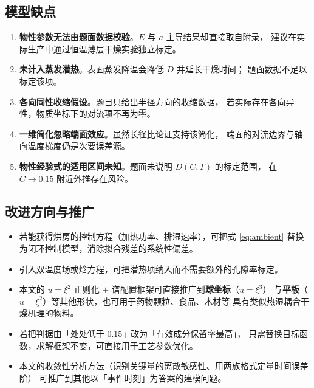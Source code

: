 \documentclass[withoutpreface,bwprint]{cumcmthesis}
\begin{document}
\subsection{模型缺点}

\begin{enumerate}[leftmargin=1.9em,itemsep=2pt]
\item \textbf{物性参数无法由题面数据校验}。$E$ 与 $a$ 主导结果却直接取自附录，
建议在实际生产中通过恒温薄层干燥实验独立标定。
\item \textbf{未计入蒸发潜热}。表面蒸发降温会降低 $D$ 并延长干燥时间；
题面数据不足以标定该项。
\item \textbf{各向同性收缩假设}。题目只给出半径方向的收缩数据，
若实际存在各向异性，物质坐标下的对流项不再为零。
\item \textbf{一维简化忽略端面效应}。虽然长径比论证支持该简化，
端面的对流边界与轴向温度梯度仍是次要误差源。
\item \textbf{物性经验式的适用区间未知}。题面未说明 $D(C,T)$ 的标定范围，
在 $C\to0.15$ 附近外推存在风险。
\end{enumerate}

\subsection{改进方向与推广}

\begin{itemize}[leftmargin=1.7em,itemsep=2pt]
\item 若能获得烘房的控制方程（加热功率、排湿速率），可把式 \eqref{eq:ambient}
替换为闭环控制模型，消除拟合残差的系统性偏差。
\item 引入双温度场或焓方程，可把潜热项纳入而不需要额外的孔隙率标定。
\item 本文的 $u=\xi^2$ 正则化 $+$ 谱配置框架可直接推广到\textbf{球坐标}（$u=\xi^3$）
与\textbf{平板}（$u=\xi^2$）等其他形状，也可用于药物颗粒、食品、木材等
具有类似热湿耦合干燥机理的物料。
\item 若把判据由「处处低于 $0.15$」改为「有效成分保留率最高」，
只需替换目标函数，求解框架不变，可直接用于工艺参数优化。
\item 本文的收敛性分析方法（识别关键量的离散敏感性、用两族格式定量时间误差阶）
可推广到其他以「事件时刻」为答案的建模问题。
\end{itemize}
\end{document}
